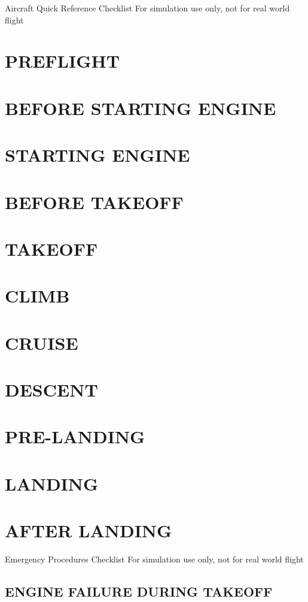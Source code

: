 \documentclass{article}
\begin{document}
\centering
{\fontsize{25}{70}\selectfont Aircraft}
\break
{\fontsize{20.74}{70}\selectfont Quick Reference Checklist}
\break
\color{Red}
{\fontsize{10}{70}\selectfont For simulation use only, not for real world flight}

\color{Black}
\begin{multicols*}{2}
\section*{PREFLIGHT}
\section*{BEFORE STARTING ENGINE}
\section*{STARTING ENGINE}
\section*{BEFORE TAKEOFF}
\section*{TAKEOFF}
\section*{CLIMB}
\section*{CRUISE}
\section*{DESCENT}
\section*{PRE-LANDING}
\section*{LANDING}
\section*{AFTER LANDING}

\end{multicols*}
\newpage
\centering
{\fontsize{20.74}{70}\selectfont Emergency Procedures Checklist}
\break
\color{Red}
{\fontsize{10}{70}\selectfont For simulation use only, not for real world flight}
\begin{multicols*}{2}
\section*{ENGINE FAILURE DURING TAKEOFF}
\end{multicols*}
\end{document}
